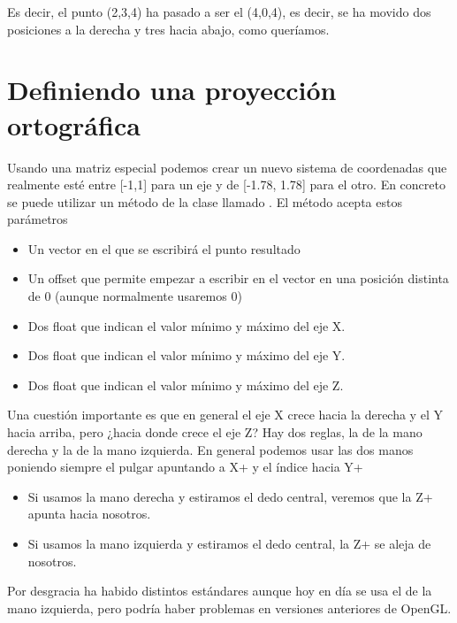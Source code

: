 \documentclass[a4paper,12pt,spanish]{sphinxmanual}
\begin{document}
Es decir, el punto (2,3,4) ha pasado a ser el (4,0,4), es decir, se ha movido dos posiciones a la derecha y tres hacia abajo, como queríamos.


\section{Definiendo una proyección ortográfica}
\label{cap5opengl:definiendo-una-proyeccion-ortografica}
Usando una matriz especial podemos crear un nuevo sistema de coordenadas que realmente esté entre {[}-1,1{]} para un eje y de {[}-1.78, 1.78{]} para el otro. En concreto se puede utilizar un método de la clase  llamado . El método acepta estos parámetros
\begin{itemize}
\item {} 
Un vector en el que se escribirá el punto resultado

\item {} 
Un offset que permite empezar a escribir en el vector en una posición distinta de 0 (aunque normalmente usaremos 0)

\item {} 
Dos float que indican el valor mínimo y máximo del eje X.

\item {} 
Dos float que indican el valor mínimo y máximo del eje Y.

\item {} 
Dos float que indican el valor mínimo y máximo del eje Z.

\end{itemize}

Una cuestión importante es que en general el eje X crece hacia la derecha y el Y hacia arriba, pero ¿hacia donde crece el eje Z? Hay dos reglas, la de la mano derecha y la de la mano izquierda. En general podemos usar las dos manos poniendo siempre el pulgar apuntando a X+ y el índice hacia Y+
\begin{itemize}
\item {} 
Si usamos la mano derecha y estiramos el dedo central, veremos que la Z+ apunta hacia nosotros.

\item {} 
Si usamos la mano izquierda y estiramos el dedo central, la Z+ se aleja de nosotros.

\end{itemize}

Por desgracia ha habido distintos estándares aunque hoy en día se usa el de la mano izquierda, pero podría haber problemas en versiones anteriores de OpenGL.
\end{document}
